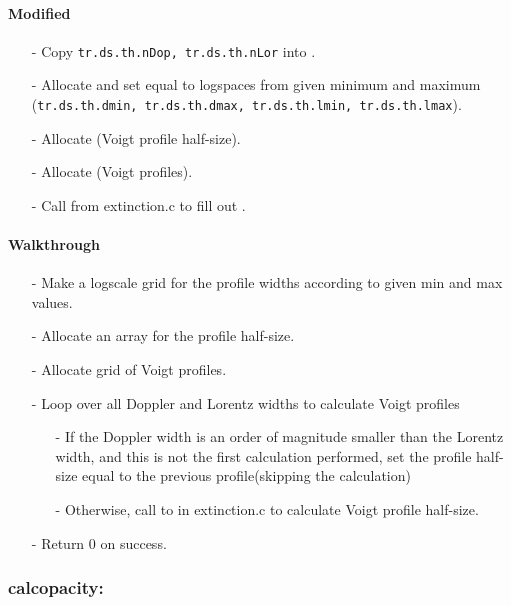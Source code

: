 \documentclass[letterpaper,12pt]{article}
\begin{document}
\paragraph{Modified}
\begin{enumerate}[leftmargin=10pt, noitemsep, parsep=0pt, topsep=0ex]
\item[-] Copy {\tt tr.ds.th.nDop, tr.ds.th.nLor} into .
\item[-] Allocate and set  equal to logspaces from given minimum and maximum ({\tt tr.ds.th.dmin, tr.ds.th.dmax, tr.ds.th.lmin, tr.ds.th.lmax}).
\item[-] Allocate  (Voigt profile half-size).
\item[-] Allocate  (Voigt profiles).
\item[-] Call  from extinction.c to fill out .
\end{enumerate}

\paragraph{Walkthrough}
\begin{enumerate}[leftmargin=10pt, noitemsep, parsep=0pt, topsep=0ex]
\item[-] Make a logscale grid for the profile widths according to given min and max values.
\item[-] Allocate an array for the profile half-size.
\item[-] Allocate grid of Voigt profiles.
\item[-] Loop over all Doppler and Lorentz widths to calculate Voigt profiles
\begin{enumerate}[leftmargin=10pt, noitemsep, parsep=0pt, topsep=0ex]
\item[-] If the Doppler width is an order of magnitude smaller than the Lorentz width, and this is not the first calculation performed, set the profile half-size equal to the previous profile(skipping the calculation)
\item[-] Otherwise, call to  in extinction.c to calculate Voigt profile half-size.
\end{enumerate}
\item[-] Return 0 on success.
\end{enumerate}

\subsubsection{calcopacity:}
\end{document}
